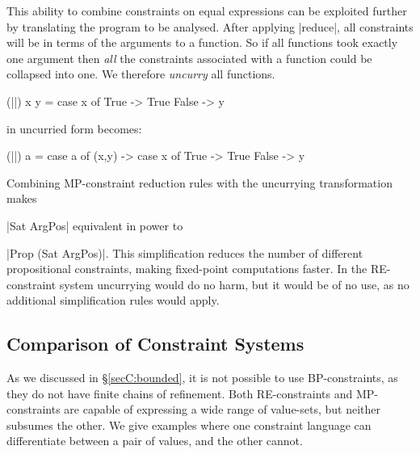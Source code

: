 \noindent This ability to combine constraints on equal expressions can be exploited further by translating the program to be analysed. After applying |reduce|, all constraints will be in terms of the arguments to a function. So if all functions took exactly one argument then \textit{all} the constraints associated with a function could be collapsed into one. We therefore \textit{uncurry} all functions.

\begin{example}
\begin{code}
(||) x y = case  x of
                 True   -> True
                 False  -> y
\end{code}

\noindent in uncurried form becomes:

\begin{onepage}
\begin{code}
(||) a = case  a of
               (x,y) -> case  x of
                              True    -> True
                              False   -> y
\end{code}
\end{onepage}
\end{example}

Combining MP-constraint reduction rules with the uncurrying transformation makes \ignore|Sat ArgPos| equivalent in power to \ignore|Prop (Sat ArgPos)|. This simplification reduces the number of different propositional constraints, making fixed-point computations faster. In the RE-constraint system uncurrying would do no harm, but it would be of no use, as no additional simplification rules would apply.

\subsection{Comparison of Constraint Systems}

As we discussed in \S\ref{secC:bounded}, it is not possible to use BP-constraints, as they do not have finite chains of refinement. Both RE-constraints and MP-constraints are capable of expressing a wide range of value-sets, but neither subsumes the other. We give examples where one constraint language can differentiate between a pair of values, and the other cannot.

\begin{comment}
\begin{code}
data T = T
\end{code}
\end{comment}

